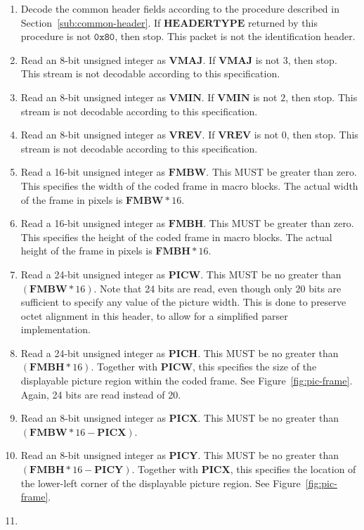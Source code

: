 \documentclass[11pt,letterpaper]{book}
\newcommand{\bitvar}[1]{\ensuremath{\mathbf{\bm #1}}}
\newcommand{\hex}[1]{\ensuremath{\mathtt{0x#1}}}
\numberwithin{equation}{chapter}
\numberwithin{figure}{chapter}
\numberwithin{table}{chapter}
\begin{document}
\begin{enumerate}
\item
Decode the common header fields according to the procedure described in
 Section~\ref{sub:common-header}.
If \bitvar{HEADERTYPE} returned by this procedure is not \hex{80}, then stop.
This packet is not the identification header.
\item
Read an 8-bit unsigned integer as \bitvar{VMAJ}.
If \bitvar{VMAJ} is not $3$, then stop.
This stream is not decodable according to this specification.
\item
Read an 8-bit unsigned integer as \bitvar{VMIN}.
If \bitvar{VMIN} is not $2$, then stop.
This stream is not decodable according to this specification.
\item
Read an 8-bit unsigned integer as \bitvar{VREV}.
If \bitvar{VREV} is not $0$, then stop.
This stream is not decodable according to this specification.
\item
Read a 16-bit unsigned integer as \bitvar{FMBW}.
This MUST be greater than zero.
This specifies the width of the coded frame in macro blocks.
The actual width of the frame in pixels is $\bitvar{FMBW}*16$.
\item
Read a 16-bit unsigned integer as \bitvar{FMBH}.
This MUST be greater than zero.
This specifies the height of the coded frame in macro blocks.
The actual height of the frame in pixels is $\bitvar{FMBH}*16$.
\item
Read a 24-bit unsigned integer as \bitvar{PICW}.
This MUST be no greater than $(\bitvar{FMBW}*16)$.
Note that 24 bits are read, even though only 20 bits are sufficient to specify
 any value of the picture width.
This is done to preserve octet alignment in this header, to allow for a
 simplified parser implementation.
\item
Read a 24-bit unsigned integer as \bitvar{PICH}.
This MUST be no greater than $(\bitvar{FMBH}*16)$.
Together with \bitvar{PICW}, this specifies the size of the displayable picture
 region within the coded frame.
See Figure~\ref{fig:pic-frame}.
Again, 24 bits are read instead of 20.
\item
Read an 8-bit unsigned integer as \bitvar{PICX}.
This MUST be no greater than $(\bitvar{FMBW}*16-\bitvar{PICX})$.
\item
Read an 8-bit unsigned integer as \bitvar{PICY}.
This MUST be no greater than $(\bitvar{FMBH}*16-\bitvar{PICY})$.
Together with \bitvar{PICX}, this specifies the location of the lower-left
 corner of the displayable picture region.
See Figure~\ref{fig:pic-frame}.
\item

\end{enumerate}
\end{document}
